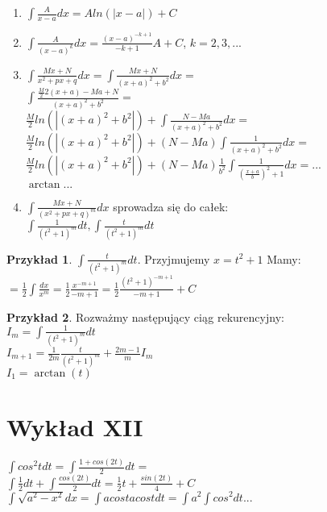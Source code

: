 \documentclass{article}
\theoremstyle{definition}
\theoremstyle{definition}
\theoremstyle{definition}
\newtheorem{pk}{Przykład}[subsection]
\theoremstyle{definition}
\begin{document}
\begin{enumerate}
    \item $\int \frac{A}{x-a} dx = A ln(|x-a|) + C$
    \item $\int \frac{A}{(x-a)^k} dx = \frac{(x-a)^{-k+1}}{-k+1} A + C$, $k=2,3,...$
    \item $\int \frac{Mx+N}{x^2+px+q} dx = \int \frac{Mx+N}{(x+a)^2+b^2} dx =$\\
    $\int \frac{\frac{M}{2}2(x+a)-Ma+N}{(x+a)^2+b^2}=$\\
    $\frac{M}{2} ln(|(x+a)^2 + b^2|)+\int \frac{N-Ma}{(x+a)^2+b^2} dx=$\\
    $\frac{M}{2} ln(|(x+a)^2 + b^2|)+(N-Ma)\int \frac{1}{(x+a)^2+b^2} dx=$\\
    $\frac{M}{2} ln(|(x+a)^2 + b^2|)+(N-Ma)\frac{1}{b^2}\int \frac{1}{(\frac{x+a}{b})^2+1}dx=...$\\
    $\arctan...$
    \item $\int \frac{Mx+N}{(x^2+px+q)^m} dx$ sprowadza się do całek:\\ 
    $\int \frac{1}{(t^2+1)^m} dt, \int \frac {t}{(t^2+1)^m} dt$
\end{enumerate}

\begin{pk}
    $\int \frac{t}{(t^2+1)^m} dt$. Przyjmujemy $x=t^2+1$ Mamy:\\
    $= \frac{1}{2} \int \frac{dx}{x^m} = \frac{1}{2} \frac{x^{-m+1}}{-m+1}= \frac{1}{2}\frac{(t^2+1)^{-m+1}}{-m+1}+C$
\end{pk}

\begin{pk}
    Rozważmy następujący ciąg rekurencyjny:\\
    $I_m = \int \frac{1}{(t^2+1)^m} dt$\\
    $I_{m+1} = \frac{1}{2m} \frac{t}{(t^2+1)^m} + \frac{2m-1}{m} I_m$\\
    $I_1 = \arctan(t)$
\end{pk}

\section{Wykład XII}

$\int cos^2 t dt = \int \frac{1+cos(2t)}{2} dt =$\\
$\int \frac{1}{2} dt + \int \frac{cos(2t)}{2} dt = \frac{1}{2}t + \frac{sin(2t)}{4} + C$\\
$\int \sqrt{a^2-x^2} dx = \int a cost a cost dt = \int a^2 \int cos^2dt...$
\end{document}
